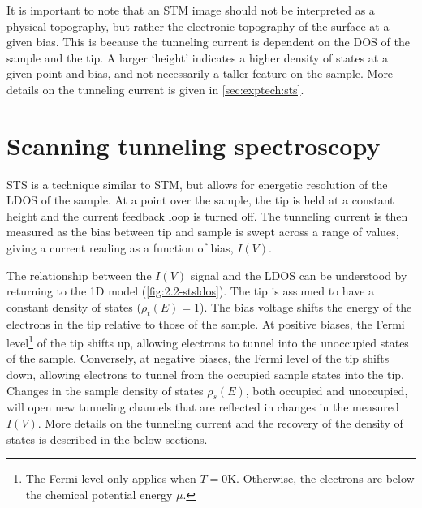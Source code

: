 \begin{figure} [h]
    \centering
    \caption{}
    \label{fig:2.1-stmexample}
\end{figure}

It is important to note that an \ac{STM} image should not be interpreted as a physical topography, but rather the electronic topography of the surface at a given bias. This is because the tunneling current is dependent on the \ac{DOS} of the sample and the tip. A larger `height' indicates a higher density of states at a given point and bias, and not necessarily a taller feature on the sample. More details on the tunneling current is given in \autoref{sec:exptech:sts}.




\section{Scanning tunneling spectroscopy}
\label{sec:exptech:sts}

\Acf{STS} is a technique similar to \ac{STM}, but allows for energetic resolution of the \ac{LDOS} of the sample. At a point over the sample, the tip is held at a constant height and the current feedback loop is turned off. The tunneling current is then measured as the bias between tip and sample is swept across a range of values, giving a current reading as a function of bias, $I(V)$.

The relationship between the $I(V)$ signal and the \ac{LDOS} can be understood by returning to the \ac{1D} model (\autoref{fig:2.2-stsldos}). The tip is assumed to have a constant density of states ($\rho_t(E) = 1$). The bias voltage shifts the energy of the electrons in the tip relative to those of the sample. At positive biases, the Fermi level\footnote{The Fermi level only applies when $T = 0$K. Otherwise, the electrons are below the chemical potential energy $\mu$.} of the tip shifts up, allowing electrons to tunnel into the unoccupied states of the sample. Conversely, at negative biases, the Fermi level of the tip shifts down, allowing electrons to tunnel from the occupied sample states into the tip. Changes in the sample density of states $\rho_s(E)$, both occupied and unoccupied, will open new tunneling channels that are reflected in changes in the measured $I(V)$. More details on the tunneling current and the recovery of the density of states is described in the below sections.


